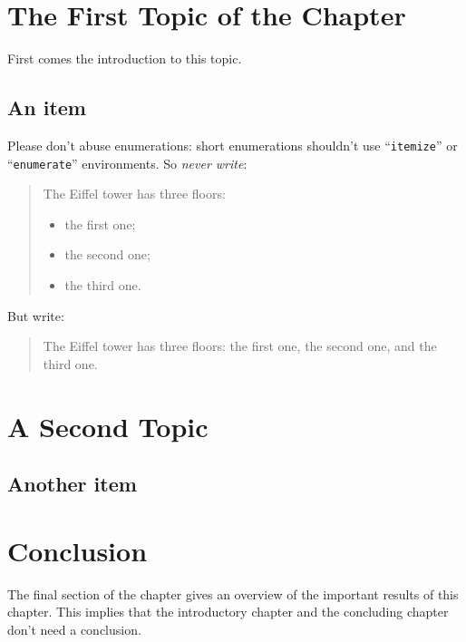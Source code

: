 


\section{The First Topic of the Chapter}
First comes the introduction to this topic.


\subsection{An item}
Please don't abuse enumerations: short enumerations shouldn't use
``\verb|itemize|'' or ``\texttt{enumerate}'' environments.
So \emph{never write}: 
\begin{quote}
  The Eiffel tower has three floors:
  \begin{itemize}
  \item the first one;
  \item the second one;
  \item the third one.
  \end{itemize}
\end{quote}
But write:
\begin{quote}
  The Eiffel tower has three floors: the first one, the second one, and the
  third one.
\end{quote}

\section{A Second Topic}


\subsection{Another item}


\section{Conclusion}
The final section of the chapter gives an overview of the important results
of this chapter. This implies that the introductory chapter and the
concluding chapter don't need a conclusion.



